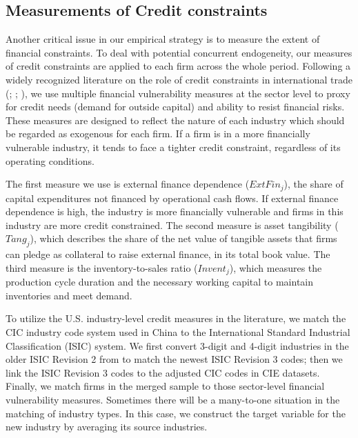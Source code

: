 \documentclass[12pt]{article}
\begin{document}
\subsection{Measurements of Credit constraints} \label{Credit Constraints}

Another critical issue in our empirical strategy is to measure the extent of financial constraints. To deal with potential concurrent endogeneity, our measures of credit constraints are applied to each firm across the whole period. Following a widely recognized literature on the role of credit constraints in international trade (\cite{kroszner2007}; \cite{manova-wei-zhang2015}; \cite{fan-lai-li2015}), we use multiple financial vulnerability measures at the sector level to proxy for credit needs (demand for outside capital) and ability to resist financial risks. These measures are designed to reflect the nature of each industry which should be regarded as exogenous for each firm. If a firm is in a more financially vulnerable industry, it tends to face a tighter credit constraint, regardless of its operating conditions.

The first measure we use is external finance dependence ($ExtFin_j$), the share of capital expenditures not financed by operational cash flows. If external finance dependence is high, the industry is more financially vulnerable and firms in this industry are more credit constrained. The second measure is asset tangibility ($Tang_j$), which describes the share of the net value of tangible assets that firms can pledge as collateral to raise external finance, in its total book value. The third measure is the inventory-to-sales ratio ($Invent_j$), which measures the production cycle duration and the necessary working capital to maintain inventories and meet demand.  

To utilize the U.S. industry-level credit measures in the literature, we match the CIC industry code system used in China to the International Standard Industrial Classification (ISIC) system. We first convert 3-digit and 4-digit industries in the older ISIC Revision 2 from \cite{manova-wei-zhang2015} to match the newest ISIC Revision 3 codes; then we link the ISIC Revision 3 codes to the adjusted CIC codes in CIE datasets. Finally, we match firms in the merged sample to those sector-level financial vulnerability measures. Sometimes there will be a many-to-one situation in the matching of industry types. In this case, we construct the target variable for the new industry by averaging its source industries.
\end{document}
